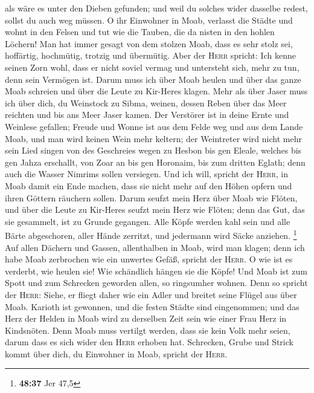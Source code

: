 als wäre es unter den Dieben gefunden; und weil du solches wider
dasselbe redest, sollst du auch weg müssen.  O ihr
Einwohner in Moab, verlasst die Städte und wohnt in den Felsen und tut
wie die Tauben, die da nisten in den hohlen Löchern!  Man
hat immer gesagt von dem stolzen Moab, dass es sehr stolz sei,
hoffärtig, hochmütig, trotzig und übermütig.  Aber der
\textsc{Herr} spricht: Ich kenne seinen Zorn wohl, dass er nicht soviel
vermag und untersteht sich, mehr zu tun, denn sein Vermögen ist.
 Darum muss ich über Moab heulen und über das ganze Moab
schreien und über die Leute zu Kir-Heres klagen.  Mehr
als über Jaser muss ich über dich, du Weinstock zu Sibma, weinen, dessen
Reben über das Meer reichten und bis ans Meer Jaser kamen. Der Verstörer
ist in deine Ernte und Weinlese gefallen;  Freude und
Wonne ist aus dem Felde weg und aus dem Lande Moab, und man wird keinen
Wein mehr keltern; der Weintreter wird nicht mehr sein Lied singen
 von des Geschreies wegen zu Hesbon bis gen Eleale,
welches bis gen Jahza erschallt, von Zoar an bis gen Horonaim, bis zum
dritten Eglath; denn auch die Wasser Nimrims sollen versiegen.
 Und ich will, spricht der \textsc{Herr}, in Moab damit
ein Ende machen, dass sie nicht mehr auf den Höhen opfern und ihren
Göttern räuchern sollen.  Darum seufzt mein Herz über
Moab wie Flöten, und über die Leute zu Kir-Heres seufzt mein Herz wie
Flöten; denn das Gut, das sie gesammelt, ist zu Grunde gegangen.
 Alle Köpfe werden kahl sein und alle Bärte abgeschoren,
aller Hände zerritzt, und jedermann wird Säcke anziehen. \footnote{\textbf{48:37}
  Jer 47,5}  Auf allen Dächern und Gassen, allenthalben
in Moab, wird man klagen; denn ich habe Moab zerbrochen wie ein unwertes
Gefäß, spricht der \textsc{Herr}.  O wie ist es verderbt,
wie heulen sie! Wie schändlich hängen sie die Köpfe! Und Moab ist zum
Spott und zum Schrecken geworden allen, so ringsumher wohnen.
 Denn so spricht der \textsc{Herr}: Siehe, er fliegt
daher wie ein Adler und breitet seine Flügel aus über Moab.
 Karioth ist gewonnen, und die festen Städte sind
eingenommen; und das Herz der Helden in Moab wird zu derselben Zeit sein
wie einer Frau Herz in Kindsnöten.  Denn Moab muss
vertilgt werden, dass sie kein Volk mehr seien, darum dass es sich wider
den \textsc{Herr} erhoben hat.  Schrecken, Grube und
Strick kommt über dich, du Einwohner in Moab, spricht der \textsc{Herr}.
